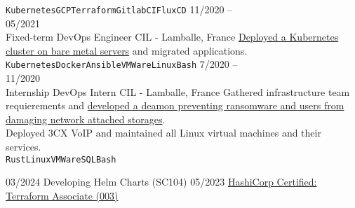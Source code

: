 \documentclass[10pt]{developercv} %
\begin{document}
\begin{entrylist}
{		\texttt{Kubernetes}\slashsep\texttt{GCP}\slashsep\texttt{Terraform}\slashsep\texttt{GitlabCI}\slashsep\texttt{FluxCD}}
	\entry
		{11/2020 --\\05/2021\\\footnotesize{Fixed-term}}
		{DevOps Engineer}
		{CIL - Lamballe, France}
		{\href{https://github.com/Ant0wan/VMWare-Kubenetes-cluster}{Deployed a Kubernetes cluster on bare metal servers} and migrated applications.\\
		\texttt{Kubernetes}\slashsep\texttt{Docker}\slashsep\texttt{Ansible}\slashsep\texttt{VMWare}\slashsep\texttt{Linux}\slashsep\texttt{Bash}}
	\entry
		{7/2020 --\\11/2020\\\footnotesize{Internship}}
		{DevOps Intern}
		{CIL - Lamballe, France}
		{Gathered infrastructure team requierements and \href{https://github.com/Ant0wan/Randetect}{developed a deamon preventing ransomware and users from damaging network attached storages}.\\
Deployed 3CX VoIP and maintained all Linux virtual machines and their services.\\
		\texttt{Rust}\slashsep\texttt{Linux}\slashsep\texttt{VMWare}\slashsep\texttt{SQL}\slashsep\texttt{Bash}}
\end{entrylist}



\begin{entrylist}
	\certentry
		{03/2024}
		{Developing Helm Charts (SC104)}
	\certentry
		{05/2023}
		{\href{https://www.credly.com/badges/7b8f2540-6b35-43a7-84d6-24dceb4001ee/linked_in_profile}{HashiCorp Certified: Terraform Associate (003)}}
\end{entrylist}


\end{document}

